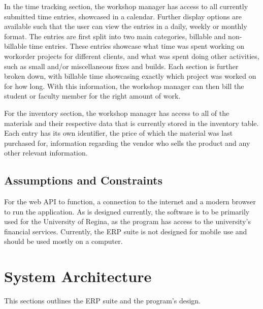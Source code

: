 {{{{In the time tracking section, the workshop manager has access to all currently submitted time entries, showcased in a calendar. Further display options are available such that the user can view the entries in a daily, weekly or monthly format. The entries are first split into two main categories, billable and non-billable time entries. These entries showcase what time was spent working on workorder projects for different clients, and what was spent doing other activities, such as small and/or miscellaneous fixes and builds. Each section is further broken down, with billable time showcasing exactly which project was worked on for how long. With this information, the workshop manager can then bill the student or faculty member for the right amount of work. 
\newline
{\setlength{\parindent}{0cm}

For the inventory section, the workshop manager has access to all of the materials and their respective data that is currently stored in the inventory table. Each entry has its own identifier, the price of which the material was last purchased for, information regarding the vendor who sells the product and any other relevant information. 

\subsection{Assumptions and Constraints}
For the web API to function, a connection to the internet and a modern browser to run the application. As is designed currently, the software is to be primarily used for the University of Regina, as the program has access to the university's financial services. Currently, the ERP suite is not designed for mobile use and should be used mostly on a computer. 

\newpage

\section{System Architecture}
This sections outlines the ERP suite and the program's design.


}}}}}
